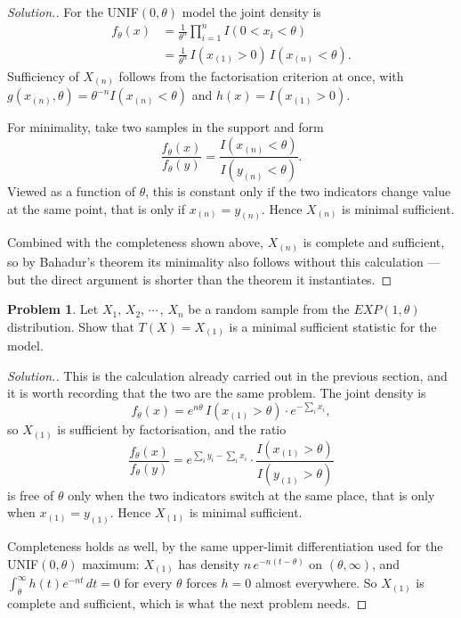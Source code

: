 \documentclass[12pt,a4paper]{report}
\theoremstyle{definition}
\newtheorem{problemx}{Problem}[section]
\newenvironment{problem}{\begin{problemx}}{\end{problemx}}
\newenvironment{solution}
  {\renewcommand{\qedsymbol}{}\begin{proof}[\textit{Solution}.]}
  {\end{proof}}
\begin{document}
\begin{solution}
For the UNIF$(0,\theta)$ model the joint density is
\begin{align*}
f_{\theta}(x) &= \frac{1}{\theta^{n}}\prod_{i=1}^{n}I\left(0<x_i<\theta\right)\\
&= \frac{1}{\theta^{n}}\,I\left(x_{(1)}>0\right)\,I\left(x_{(n)}<\theta\right).
\end{align*}
Sufficiency of $X_{(n)}$ follows from the factorisation criterion at once, with
$g\left(x_{(n)},\theta\right)=\theta^{-n}I\left(x_{(n)}<\theta\right)$ and
$h(x)=I\left(x_{(1)}>0\right)$.

For minimality, take two samples in the support and form
\[\frac{f_{\theta}(x)}{f_{\theta}(y)}
= \frac{I\left(x_{(n)}<\theta\right)}{I\left(y_{(n)}<\theta\right)} .\]
Viewed as a function of $\theta$, this is constant only if the two indicators
change value at the same point, that is only if $x_{(n)} = y_{(n)}$. Hence
$X_{(n)}$ is minimal sufficient.

Combined with the completeness shown above, $X_{(n)}$ is complete and sufficient,
so by Bahadur's theorem its minimality also follows without this calculation ---
but the direct argument is shorter than the theorem it instantiates.
\end{solution}

\begin{problem}
Let $X_1, \, X_2, \, \cdots\, , \, X_n$ be a random sample from the $EXP(1, \theta)$ distribution. Show that $T(X) = X_{(1)}$ is a minimal sufficient statistic for the model.
\end{problem}

\begin{solution}
This is the calculation already carried out in the previous section, and it is
worth recording that the two are the same problem. The joint density is
\[f_{\theta}(x) = e^{n\theta}\,I\left(x_{(1)}>\theta\right)\cdot e^{-\sum_i x_i},\]
so $X_{(1)}$ is sufficient by factorisation, and the ratio
\[\frac{f_{\theta}(x)}{f_{\theta}(y)}
= e^{\sum_i y_i-\sum_i x_i}\cdot\frac{I\left(x_{(1)}>\theta\right)}{I\left(y_{(1)}>\theta\right)}\]
is free of $\theta$ only when the two indicators switch at the same place, that
is only when $x_{(1)}=y_{(1)}$. Hence $X_{(1)}$ is minimal sufficient.

Completeness holds as well, by the same upper-limit differentiation used for the
UNIF$(0,\theta)$ maximum: $X_{(1)}$ has density $n\,e^{-n(t-\theta)}$ on
$(\theta,\infty)$, and $\int_{\theta}^{\infty}h(t)e^{-nt}\,dt = 0$ for every
$\theta$ forces $h=0$ almost everywhere. So $X_{(1)}$ is complete and sufficient,
which is what the next problem needs.
\end{solution}
\end{document}
